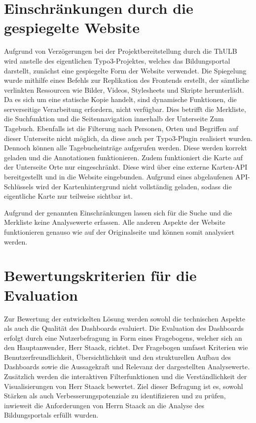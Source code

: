 \section{Einschränkungen durch die gespiegelte Website}
\label{sec:einschränkungen }
Aufgrund von Verzögerungen bei der Projektbereitstellung durch die ThULB wird anstelle des eigentlichen Typo3-Projektes, welches das Bildungsportal darstellt, zunächst eine gespiegelte Form der Website verwendet. Die Spiegelung wurde mithilfe eines Befehls zur Replikation des Frontends erstellt, der sämtliche verlinkten Ressourcen wie Bilder, Videos, Stylesheets und Skripte herunterlädt. Da es sich um eine statische Kopie handelt, sind dynamische Funktionen, die serverseitige Verarbeitung erfordern, nicht verfügbar. Dies betrifft die Merkliste, die Suchfunktion und die Seitennavigation innerhalb der Unterseite \glqq Zum Tagebuch\grqq{}. Ebenfalls ist die Filterung nach Personen, Orten und Begriffen auf dieser Unterseite nicht möglich, da diese auch per Typo3-Plugin realisiert wurden. Dennoch können alle Tagebucheinträge aufgerufen werden. Diese werden korrekt geladen und die Annotationen funktionieren. Zudem funktioniert die Karte auf der Unterseite \glqq Orte\grqq{} nur eingeschränkt. Diese wird über eine externe Karten-API bereitgestellt und in die Website eingebunden. Aufgrund eines abgelaufenen API-Schlüssels wird der Kartenhintergrund nicht vollständig geladen, sodass die eigentliche Karte nur teilweise sichtbar ist.

Aufgrund der genannten Einschränkungen lassen sich für die Suche und die Merkliste keine Analysewerte erfassen. Alle anderen Aspekte der Website funktionieren genauso wie auf der Originalseite und können somit analysiert werden.

\section{Bewertungskriterien für die Evaluation}
\label{sec:bewertungskriterien}
Zur Bewertung der entwickelten Lösung werden sowohl die technischen Aspekte als auch die Qualität des Dashboards evaluiert. Die Evaluation des Dashboards erfolgt durch eine Nutzerbefragung in Form eines Fragebogens, welcher sich an den Hauptanwender, Herr Staack, richtet. Der Fragebogen umfasst Kriterien wie Benutzerfreundlichkeit, Übersichtlichkeit und den strukturellen Aufbau des Dashboards sowie die Aussagekraft und Relevanz der dargestellten Analysewerte. Zusätzlich werden die interaktiven Filterfunktionen und die Verständlichkeit der Visualisierungen von Herr Staack bewertet. Ziel dieser Befragung ist es, sowohl Stärken als auch Verbesserungspotenziale zu identifizieren und zu prüfen, inwieweit die Anforderungen von Herrn Staack an die Analyse des Bildungsportals erfüllt wurden.

